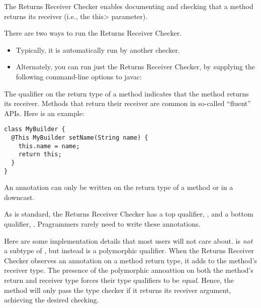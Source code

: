 \htmlhr
{}

The Returns Receiver Checker enables documenting and checking that a method
returns its receiver (i.e., the \<this> parameter).

There are two ways to run the Returns Receiver Checker.
\begin{itemize}
\item
Typically, it is automatically run by another checker.
\item
Alternately, you can run just the Returns Receiver Checker, by
supplying the following command-line options to javac:
\end{itemize}



The qualifier  on the return
type of a method indicates that the method returns its receiver.  Methods
that return their receiver are common in so-called ``fluent'' APIs.  Here
is an example:

\begin{Verbatim}
class MyBuilder {
  @This MyBuilder setName(String name) {
    this.name = name;
    return this;
  }
}
\end{Verbatim}

An  annotation can only be
written on the return type of a method or in a downcast.

As is standard, the Returns Receiver Checker has a top qualifier,
, and a bottom qualifier,
.
Pragrammers rarely need to write these annotations.

Here are some implementation details that most users will not care about.
is \emph{not} a subtype of ,
but instead is a polymorphic qualifier.  When the Returns Receiver Checker observes an
 annotation on a method return type,
it adds  to
the method's receiver type. The presence of the polymorphic annoattion
 on both the method's return and
receiver type forces their type qualifiers to be \emph{equal}.  Hence, the
method will only pass the type checker if it returns its receiver argument,
achieving the desired checking.


